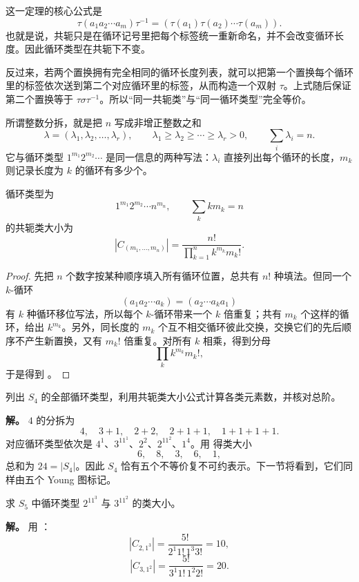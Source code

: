 这一定理的核心公式是
\[
\tau(a_1a_2\cdots a_m)\tau^{-1}
=(\tau(a_1)\tau(a_2)\cdots\tau(a_m)).
\]
也就是说，共轭只是在循环记号里把每个标签统一重新命名，并不会改变循环长度。因此循环类型在共轭下不变。

反过来，若两个置换拥有完全相同的循环长度列表，就可以把第一个置换每个循环里的标签依次送到第二个对应循环里的标签，从而构造一个双射 $\tau$。上式随后保证第二个置换等于 $\tau\sigma\tau^{-1}$。所以“同一共轭类”与“同一循环类型”完全等价。

所谓整数分拆，就是把 $n$ 写成非增正整数之和
\[
\lambda=(\lambda_1,\lambda_2,\dots,\lambda_r),
\qquad
\lambda_1\ge\lambda_2\ge\cdots\ge\lambda_r>0,
\qquad
\sum_i\lambda_i=n.
\]
它与循环类型 $1^{m_1}2^{m_2}\cdots$ 是同一信息的两种写法：$\lambda_i$ 直接列出每个循环的长度，$m_k$ 则记录长度为 $k$ 的循环有多少个。

\begin{proposition}[给定循环类型的共轭类大小]
循环类型为
\[
1^{m_1}2^{m_2}\cdots n^{m_n},
\qquad \sum_k km_k=n
\]
的共轭类大小为
\begin{equation}
|C_{(m_1,\dots,m_n)}|
=\frac{n!}{\displaystyle\prod_{k=1}^n k^{m_k}m_k!}.
\label{eq:sn-class-size}
\end{equation}

\end{proposition}

\begin{proof}
先把 $n$ 个数字按某种顺序填入所有循环位置，总共有 $n!$ 种填法。但同一个 $k$-循环
\[
(a_1a_2\cdots a_k)
=
(a_2\cdots a_ka_1)
\]
有 $k$ 种循环移位写法，所以每个 $k$-循环带来一个 $k$ 倍重复；共有 $m_k$ 个这样的循环，给出 $k^{m_k}$。另外，同长度的 $m_k$ 个互不相交循环彼此交换，交换它们的先后顺序不产生新置换，又有 $m_k!$ 倍重复。对所有 $k$ 相乘，得到分母
\[
\prod_k k^{m_k}m_k!,
\]
于是得到 。
\end{proof}

\begin{example}[{$S_4$ 的五个共轭类}]
列出 $S_4$ 的全部循环类型，利用共轭类大小公式计算各类元素数，并核对总阶。

\textbf{解。} $4$ 的分拆为
\[
4,
\quad 3+1,
\quad 2+2,
\quad 2+1+1,
\quad1+1+1+1.
\]
对应循环类型依次是 $4^1$、$3^11^1$、$2^2$、$2^11^2$、$1^4$。用  得类大小
\[
6,\quad 8,\quad3,\quad6,\quad1,
\]
总和为 $24=|S_4|$。因此 $S_4$ 恰有五个不等价复不可约表示。下一节将看到，它们同样由五个 Young 图标记。
\end{example}

\begin{workedexample}
求 $S_5$ 中循环类型 $2^11^3$ 与 $3^11^2$ 的类大小。

\textbf{解。} 用 ：
\[
|C_{2,1^3}|=\frac{5!}{2^1 1!\,1^3 3!}=10,
\]
\[
|C_{3,1^2}|=\frac{5!}{3^1 1!\,1^2 2!}=20.
\]
\end{workedexample}


